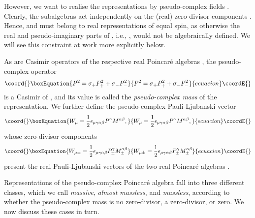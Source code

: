 \documentclass[a4paper,aps,prd,showkeys,showpacs,superscriptaddress,preprint]{revtex4}
\providecommand{\pc}{\mathbb{P}}
\providecommand{\reals}{\mathbb{R}}
\begin{document}
However, we want to realise the representations by pseudo-complex fields \myHighlight{$\phi =
\sigma_+ \phi_+ + \sigma_- \phi_-$}\coordHE{}. Clearly, the subalgebras \myHighlight{$\sigma_\pm
\mathcal{P}_\reals$}\coordHE{} act independently on the (real) zero-divisor
components \myHighlight{$\phi_\pm$}\coordHE{}. Hence, \myHighlight{$\phi_+$}\coordHE{} and \myHighlight{$\phi_-$}\coordHE{} must belong to real
representations of equal spin,  as otherwise the real and
pseudo-imaginary parts of \myHighlight{$\phi$}\coordHE{}, i.e., \myHighlight{$\phi_+ \pm \phi_-$}\coordHE{}, would not
be algebraically defined. We will see this constraint at work more explicitly below.

As \coordHE{} are Casimir operators of the respective real Poincar\'e
algebras \myHighlight{$\sigma_\pm \mathcal{P}_\reals$}\coordHE{}, the
pseudo-complex operator
\begin{equation}\coord{}\boxEquation{
  P^2 = \sigma_+ P_+^2 + \sigma_- P_-^2
}{
  P^2 = \sigma_+ P_+^2 + \sigma_- P_-^2
}{ecuacion}\coordE{}\end{equation}
is a Casimir of \myHighlight{$\mathcal{P}_\pc$}\coordHE{}, and its value \myHighlight{$M^2 \in \pc$}\coordHE{} is
called the \textsl{pseudo-complex mass} of the representation. We
further define the pseudo-complex Pauli-Ljubanski vector
\begin{equation}\coord{}\boxEquation{
  W_\mu = \frac{1}{2} \epsilon_{\mu\gamma\alpha\beta} P^\gamma M^{\alpha\beta},
}{
  W_\mu = \frac{1}{2} \epsilon_{\mu\gamma\alpha\beta} P^\gamma M^{\alpha\beta},
}{ecuacion}\coordE{}\end{equation}
whose zero-divisor components 
\begin{equation}\coord{}\boxEquation{
  W_{\mu\pm} = \frac{1}{2} \epsilon_{\mu\gamma\alpha\beta} P_\pm^\gamma
  M_\pm^{\alpha\beta}
}{
  W_{\mu\pm} = \frac{1}{2} \epsilon_{\mu\gamma\alpha\beta} P_\pm^\gamma
  M_\pm^{\alpha\beta}
}{ecuacion}\coordE{}\end{equation}
present the real Pauli-Ljubanski vectors of the two real Poincar\'e
algebras \myHighlight{$\sigma_\pm \mathcal{P}_\reals$}\coordHE{}. 

Representations of the pseudo-complex Poincar\'e algebra fall into
three different classes, which we call \textsl{massive},
\textsl{almost massless}, and \textsl{massless}, according to whether
the pseudo-complex mass is no zero-divisor, a zero-divisor, or zero. We now discuss these cases in turn.
\end{document}
